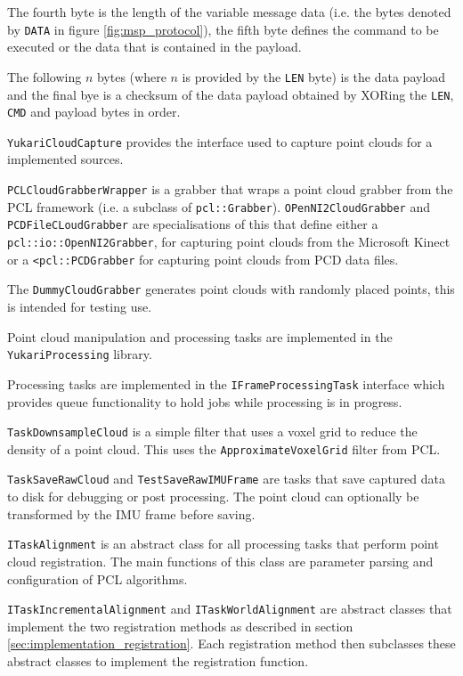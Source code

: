 \documentclass{entcs}
\begin{document}
The fourth byte is the length of the variable message data (i.e. the bytes
denoted by \texttt{DATA} in figure \ref{fig:msp_protocol}), the fifth byte
defines the command to be executed or the data that is contained in the payload.

The following $n$ bytes (where $n$ is provided by the \texttt{LEN} byte) is the
data payload and the final bye is a checksum of the data payload obtained by
XORing the \texttt{LEN}, \texttt{CMD} and payload bytes in order.

\texttt{YukariCloudCapture} provides the interface used to capture point clouds
for a implemented sources.

\texttt{PCLCloudGrabberWrapper} is a grabber that wraps a point cloud grabber
from the PCL framework (i.e. a subclass of \texttt{pcl::Grabber}).
\texttt{OPenNI2CloudGrabber} and \texttt{PCDFileCLoudGrabber} are
specialisations of this that define either a \texttt{pcl::io::OpenNI2Grabber},
for capturing point clouds from the Microsoft Kinect or a
\texttt{<pcl::PCDGrabber} for capturing point clouds from PCD data files.

The \texttt{DummyCloudGrabber} generates point clouds with randomly placed
points, this is intended for testing use.

Point cloud manipulation and processing tasks are implemented in the
\texttt{YukariProcessing} library.

Processing tasks are implemented in the \texttt{IFrameProcessingTask} interface
which provides queue functionality to hold jobs while processing is in progress.

\texttt{TaskDownsampleCloud} is a simple filter that uses a voxel grid to reduce
the density of a point cloud. This uses the \texttt{ApproximateVoxelGrid} filter
from PCL.

\texttt{TaskSaveRawCloud} and \texttt{TestSaveRawIMUFrame} are tasks that save
captured data to disk for debugging or post processing. The point cloud can
optionally be transformed by the IMU frame before saving.

\texttt{ITaskAlignment} is an abstract class for all processing tasks that
perform point cloud registration. The main functions of this class are parameter
parsing and configuration of PCL algorithms.

\texttt{ITaskIncrementalAlignment} and \texttt{ITaskWorldAlignment} are abstract
classes that implement the two registration methods as described in section
\ref{sec:implementation_registration}. Each registration method then subclasses
these abstract classes to implement the registration function.
\end{document}
